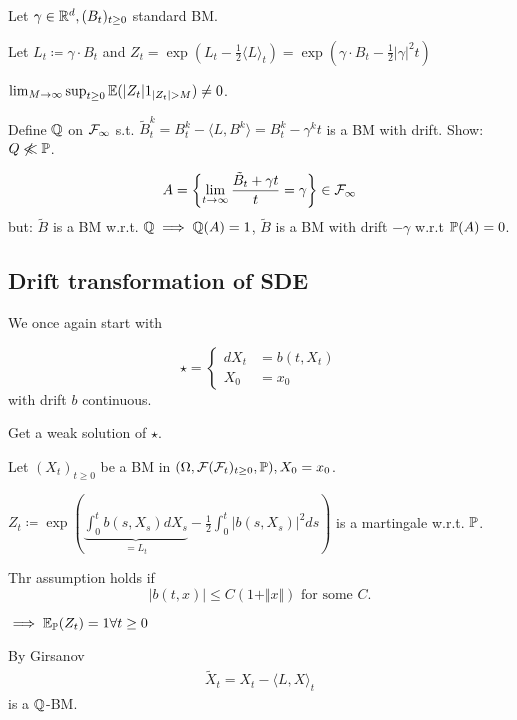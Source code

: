 \begin{aexample}
    Let $\gamma\in\mathbb{R}^d,(B_t)_{t\geq 0}$ standard BM. 

    Let $L_t\coloneqq \gamma\cdot B_t$ and $Z_t=\exp(L_t-\frac{1}{2}\langle L\rangle_t)=\exp(\gamma \cdot B_t-\frac{1}{2}|\gamma|^2t)$
    
\end{aexample}

\begin{remark}
    $\lim_{M\to\infty}\sup_{t\geq 0}\bE(|Z_t|1_{|Z_t|>M})\neq 0$.

    Define $\mathbb{Q}$ on $\mathcal{F}_\infty$ s.t. $\tilde{B}_t^k=B_t^k-\langle L,B^k\rangle=B_t^k-\gamma^kt$
    is a BM with drift. Show: $Q\not\ll\mathbb{P}$.

    \[A=\left\{\lim_{t\to\infty}\frac{\tilde{B}_t+\gamma t}{t}=\gamma\right\}\in\mathcal{F}_\infty\]
    but: $\tilde{B}$ is a BM w.r.t. $\mathbb{Q}\implies \mathbb{Q}(A)=1$, $\tilde{B}$ is a BM with drift $-\gamma$ w.r.t 
    $\mathbb{P}(A)=0$.
\end{remark}


\subsection{Drift transformation of SDE}

We once again start with

\[\star=\begin{cases}
    dX_t&=b(t,X_t)\\
    X_0&=x_0
\end{cases}\]
with drift $b$ continuous.

 Get a weak solution of $\star$.

Let $(X_t)_{t\geq 0}$ be a BM in $(\Omega,\mathcal{F}(\mathcal{F}_t)_{t\geq 0},\mathbb{P}),X_0=x_0$.

 $Z_t\coloneqq \exp\left(\underbrace{\int_0^t b(s,X_s)dX_s}_{=L_t}-\frac{1}{2}\int_0^t |b(s,X_s)|^2ds\right)$ 
is a martingale w.r.t. $\mathbb{P}$.

\begin{remark}
    Thr assumption holds if 
    \[|b(t,x)|\leq C(1+\Vert x\Vert)\text{ for some }C.\]
\end{remark}

$\implies \mathbb{E}_{\mathbb{P}}(Z_t)=1\forall t\geq 0$

By Girsanov
\begin{align*}
    \tilde{X}_t=X_t-\langle L,X\rangle_t
\end{align*}
is a $\mathbb{Q}$-BM.

